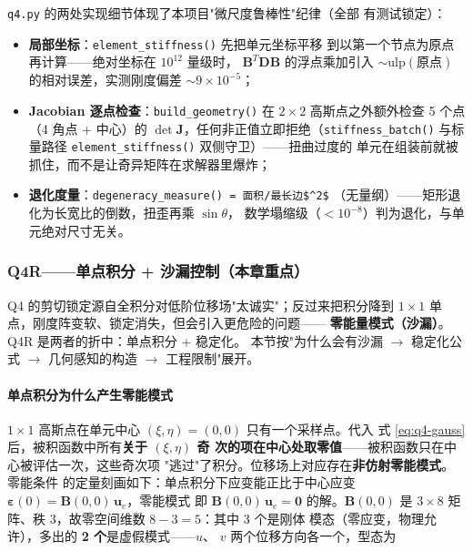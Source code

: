 \documentclass[12pt,a4paper]{ctexart}
\newcommand{\fem}{\Verb}
\begin{document}
\fem|q4.py| 的两处实现细节体现了本项目"微尺度鲁棒性"纪律（全部
有测试锁定）：

\begin{itemize}[leftmargin=*]
  \item \textbf{局部坐标}：\fem|element_stiffness()| 先把单元坐标平移
        到以第一个节点为原点再计算——绝对坐标在 $10^{12}$ 量级时，
        $\mathbf{B}^T\mathbf{D}\mathbf{B}$ 的浮点乘加引入 $\sim
        \mathrm{ulp}(\text{原点})$ 的相对误差，实测刚度偏差 $\sim
        9\times10^{-5}$；
  \item \textbf{Jacobian 逐点检查}：\fem|build_geometry()| 在 $2\times2$
        高斯点之外额外检查 5 个点（4 角点 + 中心）的
        $\det\mathbf{J}$，任何非正值立即拒绝（\fem|stiffness_batch()|
        与标量路径 \fem|element_stiffness()| 双侧守卫）——扭曲过度的
        单元在组装前就被抓住，而不是让奇异矩阵在求解器里爆炸；
  \item \textbf{退化度量}：\fem|degeneracy_measure() = 面积/最长边$^2$|
        （无量纲）——矩形退化为长宽比的倒数，扭歪再乘 $\sin\theta$，
        数学塌缩级（$<10^{-8}$）判为退化，与单元绝对尺寸无关。
\end{itemize}

\subsubsection{Q4R——单点积分 + 沙漏控制（本章重点）}

Q4 的剪切锁定源自全积分对低阶位移场"太诚实"；反过来把积分降到
$1\times1$ 单点，刚度阵变软、锁定消失，但会引入更危险的问题——
\textbf{零能量模式（沙漏）}。Q4R 是两者的折中：单点积分 + 稳定化。
本节按"为什么会有沙漏 $\to$ 稳定化公式 $\to$ 几何感知的构造
$\to$ 工程限制"展开。

\paragraph{单点积分为什么产生零能模式}

$1\times1$ 高斯点在单元中心 $(\xi,\eta)=(0,0)$ 只有一个采样点。代入
式 \eqref{eq:q4-gauss} 后，被积函数中所有\textbf{关于 $(\xi,\eta)$ 奇
次的项在中心处取零值}——被积函数只在中心被评估一次，这些奇次项
"逃过"了积分。位移场上对应存在\textbf{非仿射零能模式}。零能条件
的定量刻画如下：单点积分下应变能正比于中心应变
$\boldsymbol{\varepsilon}(0) = \mathbf{B}(0,0)\,\mathbf{u}_e$，零能模式
即 $\mathbf{B}(0,0)\,\mathbf{u}_e = \mathbf{0}$ 的解。$\mathbf{B}(0,0)$
是 $3\times8$ 矩阵、秩 3，故零空间维数 $8-3=5$：其中 3 个是刚体
模态（零应变，物理允许），多出的 \textbf{2 个}是虚假模式——$u$、
$v$ 两个位移方向各一个，型态为
\end{document}
